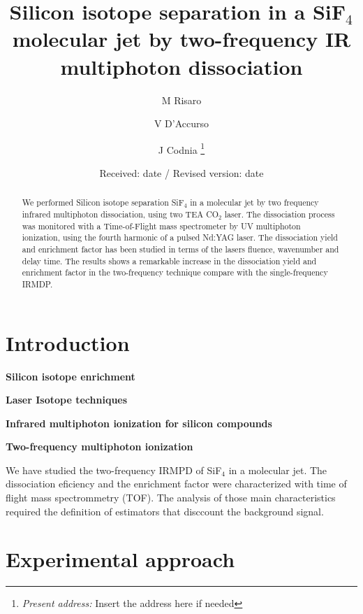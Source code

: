 \documentclass[global,twocolumn]{svjour}
\begin{document}
\title{Silicon isotope separation in a SiF$_{4}$ molecular jet by two-frequency IR multiphoton dissociation}
	\author{M Risaro \and V D'Accurso \and J Codnia%
		\thanks{\emph{Present address:} Insert the address here if needed}%
	}                     %
	\offprints{}          %
	\date{Received: date / Revised version: date}
	\maketitle
\begin{abstract}
We performed Silicon isotope separation SiF$_{4}$ in a molecular jet by two frequency infrared multiphoton dissociation, using two TEA CO$_{2}$ laser. The dissociation process was monitored with a Time-of-Flight mass spectrometer by UV multiphoton ionization, using the fourth harmonic of a pulsed Nd:YAG laser. The dissociation yield and enrichment factor has been studied in terms of the lasers fluence, wavenumber and delay time. The results shows a remarkable increase in the dissociation yield and enrichment factor in the two-frequency technique compare with the single-frequency IRMDP.
\end{abstract}
\section{Introduction}
\label{intro}

\textbf{Silicon isotope enrichment}

\textbf{Laser Isotope techniques}

\textbf{Infrared multiphoton ionization for silicon compounds}

\textbf{Two-frequency multiphoton ionization}

We have studied the two-frequency IRMPD of SiF$_{4}$ in a molecular jet. The dissociation eficiency and the enrichment factor were characterized with time of flight mass spectrommetry (TOF). The analysis of those main characteristics required the definition of estimators that disccount the background signal.  

\section{Experimental approach}
\label{sec:exerimental_approach}
\end{document}
